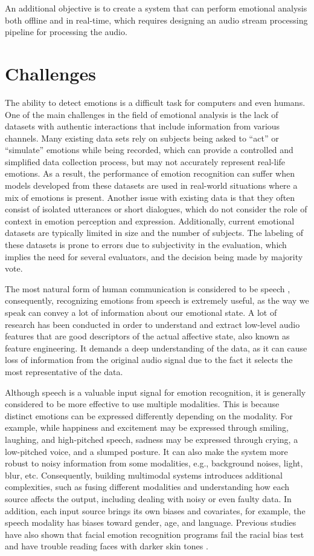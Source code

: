 An additional objective is to create a system that can perform emotional analysis both offline and in real-time, which requires designing an audio stream processing pipeline for processing the audio.


\section{Challenges}

The ability to detect emotions is a difficult task for computers and even humans. One of the main challenges in the field of emotional analysis is the lack of datasets with authentic interactions that include information from various channels. Many existing data sets rely on subjects being asked to “act” or “simulate” emotions while being recorded, which can provide a controlled and simplified data collection process, but may not accurately represent real-life emotions. As a result, the performance of emotion recognition can suffer when models developed from these datasets are used in real-world situations where a mix of emotions is present. Another issue with existing data is that they often consist of isolated utterances or short dialogues, which do not consider the role of context in emotion perception and expression. Additionally, current emotional datasets are typically limited in size and the number of subjects. The labeling of these datasets is prone to errors due to subjectivity in the evaluation, which implies the need for several evaluators, and the decision being made by majority vote.

The most natural form of human communication is considered to be speech \cite{Deng2006}, consequently, recognizing emotions from speech is extremely useful, as the way we speak can convey a lot of information about our emotional state. A lot of research has been conducted in order to understand and extract low-level audio features that are good descriptors of the actual affective state, also known as feature engineering. It demands a deep understanding of the data, as it can cause loss of information from the original audio signal due to the fact it selects the most representative of the data.

Although speech is a valuable input signal for emotion recognition, it is generally considered to be more effective to use multiple modalities. This is because distinct emotions can be expressed differently depending on the modality. For example, while happiness and excitement may be expressed through smiling, laughing, and high-pitched speech, sadness may be expressed through crying, a low-pitched voice, and a slumped posture. It can also make the system more robust to noisy information from some modalities, e.g., background noises, light, blur, etc. Consequently, building multimodal systems introduces additional complexities, such as fusing different modalities and understanding how each source affects the output, including dealing with noisy or even faulty data. In addition, each input source brings its own biases and covariates, for example, the speech modality has biases toward gender, age, and language. Previous studies have also shown that facial emotion recognition programs fail the racial bias test and have trouble reading faces with darker skin tones \cite{hagerty2021}.

